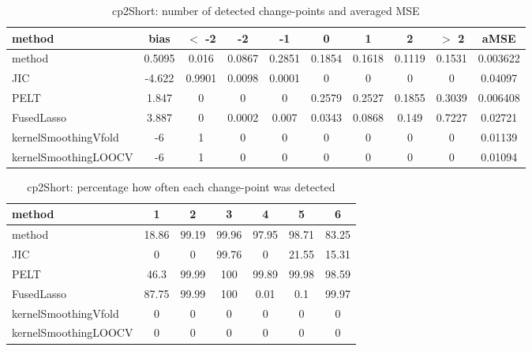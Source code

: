 \begin{table}[ht]
\centering
\begin{tabular}{l|c|ccccccc|c}
  \hline
method & bias & $<$ -2 & -2 & -1 & 0 & 1 & 2 & $>$ 2 & aMSE \\ 
  \hline
method & 0.5095 & 0.016 & 0.0867 & 0.2851 & 0.1854 & 0.1618 & 0.1119 & 0.1531 & 0.003622 \\ 
  JIC & -4.622 & 0.9901 & 0.0098 & 0.0001 &     0 &     0 &     0 &     0 & 0.04097 \\ 
  PELT & 1.847 &     0 &     0 &     0 & 0.2579 & 0.2527 & 0.1855 & 0.3039 & 0.006408 \\ 
  FusedLasso & 3.887 &     0 & 0.0002 & 0.007 & 0.0343 & 0.0868 & 0.149 & 0.7227 & 0.02721 \\ 
  kernelSmoothingVfold &    -6 &     1 &     0 &     0 &     0 &     0 &     0 &     0 & 0.01139 \\ 
  kernelSmoothingLOOCV &    -6 &     1 &     0 &     0 &     0 &     0 &     0 &     0 & 0.01094 \\ 
   \hline
\end{tabular}
\caption{cp2Short: number of detected change-points and averaged MSE} 
\label{tab:cp2ShortNjumps}
\end{table}
\begin{table}[ht]
\centering
\begin{tabular}{l|cccccc}
  \hline
method & 1 & 2 & 3 & 4 & 5 & 6 \\ 
  \hline
method &  18.86 &  99.19 &  99.96 &  97.95 &  98.71 &  83.25 \\ 
  JIC &      0 &      0 &  99.76 &      0 &  21.55 &  15.31 \\ 
  PELT &   46.3 &  99.99 &    100 &  99.89 &  99.98 &  98.59 \\ 
  FusedLasso &  87.75 &  99.99 &    100 &   0.01 &    0.1 &  99.97 \\ 
  kernelSmoothingVfold &      0 &      0 &      0 &      0 &      0 &      0 \\ 
  kernelSmoothingLOOCV &      0 &      0 &      0 &      0 &      0 &      0 \\ 
   \hline
\end{tabular}
\caption{cp2Short: percentage how often each change-point was detected} 
\label{tab:cp2ShortDetections}
\end{table}
